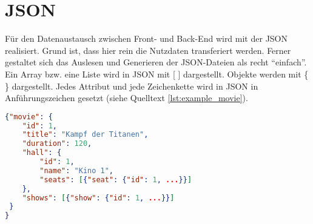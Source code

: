 \section{\acf{JSON}}
\label{sec:json}

Für den Datenaustausch zwischen Front- und Back-End wird mit der \acf{JSON} realisiert.
Grund ist, dass hier rein die Nutzdaten transferiert werden.
Ferner gestaltet sich das Auslesen und Generieren der \acs{JSON}-Dateien als recht \enquote{einfach}. \\
Ein Array bzw. eine Liste wird in \acs{JSON} mit [ ] dargestellt.
Objekte werden mit \{ \} dargestellt.
Jedes Attribut und jede Zeichenkette wird in \acs{JSON} in Anführungszeichen gesetzt (siehe Quelltext \vref{lst:example_movie}).

\begin{lstlisting}[language=json, caption={Beispiel eines Films im \acs{JSON}-Format}, label={lst:example_movie}]
{"movie": {
	"id": 1,
	"title": "Kampf der Titanen",
	"duration": 120,
	"hall": {
		"id": 1,
		"name": "Kino 1",
		"seats": [{"seat": {"id": 1, ...}}]
	},
	"shows": [{"show": {"id": 1, ...}}]
 }
}
\end{lstlisting}

